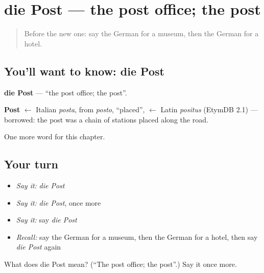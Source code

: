 \section[die Post]{die Post — the post office; the post}

\label{lesson:GE-C104-post}



\begin{quote}
Before the new one: say the German for a museum, then the German for a hotel.
\end{quote}

\subsection*{You'll want to know: die Post}
\textbf{die Post} — \textquotedblleft{}the post office; the post\textquotedblright{}.

\begin{cousinweb}
\textbf{Post} $\leftarrow$ Italian \emph{posta}, from \emph{posto}, \textquotedblleft{}placed\textquotedblright{}, $\leftarrow$ Latin \emph{positus} (EtymDB 2.1) — borrowed: the post was a chain of stations placed along the road.
\end{cousinweb}

\begin{grammarlens}[title={What you've built}]
One more word for this chapter.
\end{grammarlens}

\subsection*{Your turn}
\begin{itemize}
\raggedright
  \item \emph{Say it:} \emph{die Post}
  \item \emph{Say it:} \emph{die Post}, once more
  \item \emph{Say it:} say \emph{die Post}
  \item \emph{Recall:} say the German for a museum, then the German for a hotel, then say \emph{die Post} again
\end{itemize}

\begin{tcolorbox}[breakable,colback=teal!4,colframe=teal!35!black,title={Before you move on}]
What does die Post mean? (\textquotedblleft{}The post office; the post\textquotedblright{}.) Say it once more.
\end{tcolorbox}
